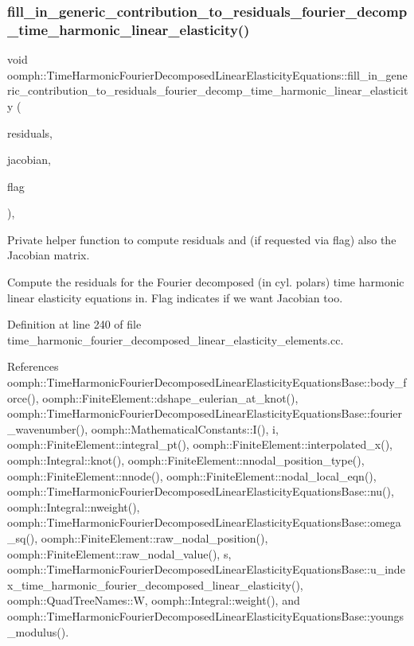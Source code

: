 \subsubsection{\texorpdfstring{fill\+\_\+in\+\_\+generic\+\_\+contribution\+\_\+to\+\_\+residuals\+\_\+fourier\+\_\+decomp\+\_\+time\+\_\+harmonic\+\_\+linear\+\_\+elasticity()}{fill\_in\_generic\_contribution\_to\_residuals\_fourier\_decomp\_time\_harmonic\_linear\_elasticity()}}
{\footnotesize\ttfamily void oomph\+::\+Time\+Harmonic\+Fourier\+Decomposed\+Linear\+Elasticity\+Equations\+::fill\+\_\+in\+\_\+generic\+\_\+contribution\+\_\+to\+\_\+residuals\+\_\+fourier\+\_\+decomp\+\_\+time\+\_\+harmonic\+\_\+linear\+\_\+elasticity (\begin{DoxyParamCaption}\item[{\hyperlink{classoomph_1_1Vector}{Vector}$<$ double $>$ \&}]{residuals,  }\item[{\hyperlink{classoomph_1_1DenseMatrix}{Dense\+Matrix}$<$ double $>$ \&}]{jacobian,  }\item[{unsigned}]{flag }\end{DoxyParamCaption})\hspace{0.3cm}{\ttfamily [private]}, {\ttfamily [virtual]}}



Private helper function to compute residuals and (if requested via flag) also the Jacobian matrix. 

Compute the residuals for the Fourier decomposed (in cyl. polars) time harmonic linear elasticity equations in. Flag indicates if we want Jacobian too. 

Definition at line 240 of file time\+\_\+harmonic\+\_\+fourier\+\_\+decomposed\+\_\+linear\+\_\+elasticity\+\_\+elements.\+cc.



References oomph\+::\+Time\+Harmonic\+Fourier\+Decomposed\+Linear\+Elasticity\+Equations\+Base\+::body\+\_\+force(), oomph\+::\+Finite\+Element\+::dshape\+\_\+eulerian\+\_\+at\+\_\+knot(), oomph\+::\+Time\+Harmonic\+Fourier\+Decomposed\+Linear\+Elasticity\+Equations\+Base\+::fourier\+\_\+wavenumber(), oomph\+::\+Mathematical\+Constants\+::\+I(), i, oomph\+::\+Finite\+Element\+::integral\+\_\+pt(), oomph\+::\+Finite\+Element\+::interpolated\+\_\+x(), oomph\+::\+Integral\+::knot(), oomph\+::\+Finite\+Element\+::nnodal\+\_\+position\+\_\+type(), oomph\+::\+Finite\+Element\+::nnode(), oomph\+::\+Finite\+Element\+::nodal\+\_\+local\+\_\+eqn(), oomph\+::\+Time\+Harmonic\+Fourier\+Decomposed\+Linear\+Elasticity\+Equations\+Base\+::nu(), oomph\+::\+Integral\+::nweight(), oomph\+::\+Time\+Harmonic\+Fourier\+Decomposed\+Linear\+Elasticity\+Equations\+Base\+::omega\+\_\+sq(), oomph\+::\+Finite\+Element\+::raw\+\_\+nodal\+\_\+position(), oomph\+::\+Finite\+Element\+::raw\+\_\+nodal\+\_\+value(), s, oomph\+::\+Time\+Harmonic\+Fourier\+Decomposed\+Linear\+Elasticity\+Equations\+Base\+::u\+\_\+index\+\_\+time\+\_\+harmonic\+\_\+fourier\+\_\+decomposed\+\_\+linear\+\_\+elasticity(), oomph\+::\+Quad\+Tree\+Names\+::W, oomph\+::\+Integral\+::weight(), and oomph\+::\+Time\+Harmonic\+Fourier\+Decomposed\+Linear\+Elasticity\+Equations\+Base\+::youngs\+\_\+modulus().



